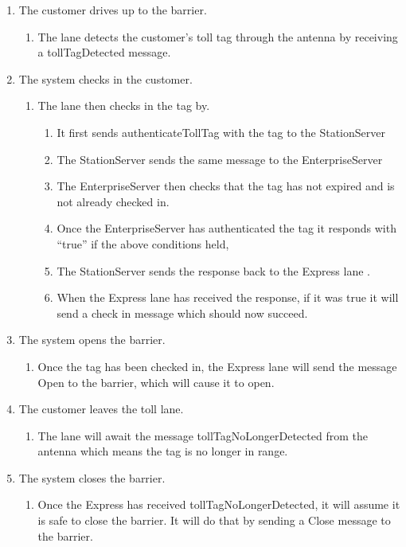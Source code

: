 \begin{enumerate}
\item The customer drives up to the barrier.

\begin{enumerate}
\item The lane detects the customer's toll tag through the antenna by receiving
a tollTagDetected message.
\end{enumerate}
\item The system checks in the customer.

\begin{enumerate}
\item The lane then checks in the tag by. 

\begin{enumerate}
\item It first sends authenticateTollTag with the tag to the StationServer
\item The StationServer sends the same message to the EnterpriseServer
\item The EnterpriseServer then checks that the tag has not expired and
is not already checked in.
\item Once the EnterpriseServer has authenticated the tag it responds with
``true'' if the above conditions held,
\item The StationServer sends the response back to the Express lane .
\item When the Express lane has received the response, if it was true it
will send a check in message which should now succeed.
\end{enumerate}
\end{enumerate}
\item The system opens the barrier.

\begin{enumerate}
\item Once the tag has been checked in, the Express lane will send the message
Open to the barrier, which will cause it to open.
\end{enumerate}
\item The customer leaves the toll lane.

\begin{enumerate}
\item The lane will await the message tollTagNoLongerDetected from the antenna
which means the tag is no longer in range.
\end{enumerate}
\item The system closes the barrier.

\begin{enumerate}
\item Once the Express has received tollTagNoLongerDetected, it will assume
it is safe to close the barrier. It will do that by sending a Close
message to the barrier.\end{enumerate}
\end{enumerate}
